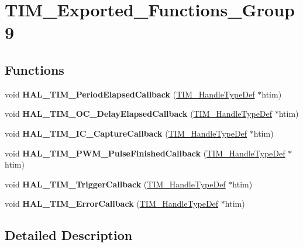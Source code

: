 \hypertarget{group___t_i_m___exported___functions___group9}{}\section{T\+I\+M\+\_\+\+Exported\+\_\+\+Functions\+\_\+\+Group9}
\label{group___t_i_m___exported___functions___group9}
\subsection*{Functions}
\begin{DoxyCompactItemize}
\item 
\mbox{\label{group___t_i_m___exported___functions___group9_ga8a3b0ad512a6e6c6157440b68d395eac}} 
void {\bfseries H\+A\+L\+\_\+\+T\+I\+M\+\_\+\+Period\+Elapsed\+Callback} (\hyperlink{struct_t_i_m___handle_type_def}{T\+I\+M\+\_\+\+Handle\+Type\+Def} $\ast$htim)
\item 
\mbox{\label{group___t_i_m___exported___functions___group9_ga1fc39499fe9db8b7fb88005e9f107a36}} 
void {\bfseries H\+A\+L\+\_\+\+T\+I\+M\+\_\+\+O\+C\+\_\+\+Delay\+Elapsed\+Callback} (\hyperlink{struct_t_i_m___handle_type_def}{T\+I\+M\+\_\+\+Handle\+Type\+Def} $\ast$htim)
\item 
\mbox{\label{group___t_i_m___exported___functions___group9_ga77a2401a35ddd9bd0b8fc28331b81381}} 
void {\bfseries H\+A\+L\+\_\+\+T\+I\+M\+\_\+\+I\+C\+\_\+\+Capture\+Callback} (\hyperlink{struct_t_i_m___handle_type_def}{T\+I\+M\+\_\+\+Handle\+Type\+Def} $\ast$htim)
\item 
\mbox{\label{group___t_i_m___exported___functions___group9_ga07e5fc4d223b16bec2fd6bed547cf91d}} 
void {\bfseries H\+A\+L\+\_\+\+T\+I\+M\+\_\+\+P\+W\+M\+\_\+\+Pulse\+Finished\+Callback} (\hyperlink{struct_t_i_m___handle_type_def}{T\+I\+M\+\_\+\+Handle\+Type\+Def} $\ast$htim)
\item 
\mbox{\label{group___t_i_m___exported___functions___group9_ga189577c72b1963671b26820d8161d678}} 
void {\bfseries H\+A\+L\+\_\+\+T\+I\+M\+\_\+\+Trigger\+Callback} (\hyperlink{struct_t_i_m___handle_type_def}{T\+I\+M\+\_\+\+Handle\+Type\+Def} $\ast$htim)
\item 
\mbox{\label{group___t_i_m___exported___functions___group9_ga6f0868af383d592940700dbb52fac016}} 
void {\bfseries H\+A\+L\+\_\+\+T\+I\+M\+\_\+\+Error\+Callback} (\hyperlink{struct_t_i_m___handle_type_def}{T\+I\+M\+\_\+\+Handle\+Type\+Def} $\ast$htim)
\end{DoxyCompactItemize}


\subsection{Detailed Description}
